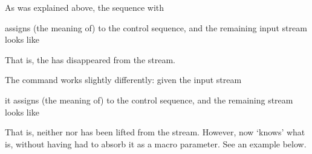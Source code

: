 \documentclass[letterpaper]{book}
\begin{document}
As was explained above, the sequence with 
\begin{disp}%
       \end{disp}
assigns (the meaning of)  to the control sequence, 
and the remaining input stream looks like
\begin{disp}\end{disp}
That is, the  has disappeared from the stream.

The command  works slightly differently:
given the input stream
\begin{disp}%
       \end{disp}
it assigns (the meaning of)  to the control sequence, 
and the remaining stream looks like
\begin{disp}\end{disp}
That is, neither  nor  has
been lifted from the stream.
However, now 
`knows' what  is, without having had to absorb it
as a macro parameter. See an example below.
\end{document}
